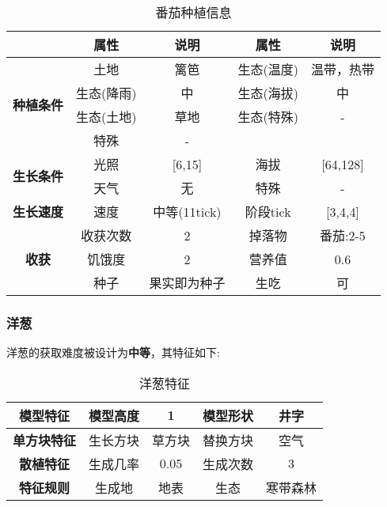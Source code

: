 \begin{table}[H]
    \centering
    \caption{番茄种植信息}
    \label{table:番茄种植信息}
    \setlength{\tabcolsep}{4mm}
    \begin{tabular}{c|cc|cc}
        \toprule
                                           & \textbf{属性} & \textbf{说明} & \textbf{属性} & \textbf{说明} \\
        \midrule
        \multirow{4}{*}{\textbf{种植条件}} & 土地          & 篱笆          & 生态(温度)    & 温带，热带    \\
                                           & 生态(降雨)    & 中            & 生态(海拔)    & 中            \\
                                           & 生态(土地)    & 草地          & 生态(特殊)    & -             \\
                                           & 特殊          & -                                             \\
        \midrule
        \multirow{2}{*}{\textbf{生长条件}} & 光照          & [6,15]        & 海拔          & [64,128]      \\
                                           & 天气          & 无            & 特殊          & -             \\
        \midrule
        \textbf{生长速度}                  & 速度          & 中等(11tick)  & 阶段tick      & [3,4,4]       \\
        \midrule
        \multirow{3}{*}{\textbf{收获}}     & 收获次数      & 2             & 掉落物        & 番茄:2-5      \\
                                           & 饥饿度        & 2             & 营养值        & 0.6           \\
                                           & 种子          & 果实即为种子  & 生吃          & 可            \\
        \bottomrule
    \end{tabular}
\end{table}

\subsubsection{洋葱}

洋葱的获取难度被设计为\textbf{中等}，其特征如下:
\begin{table}[H]
    \centering
    \caption{洋葱特征}
    \label{table:洋葱特征}
    \setlength{\tabcolsep}{4mm}
    \begin{tabular}{c|cc|cc}
        \toprule
        \textbf{模型特征}   & 模型高度 & 1      & 模型形状 & 井字     \\
        \midrule
        \textbf{单方块特征} & 生长方块 & 草方块 & 替换方块 & 空气     \\
        \midrule
        \textbf{散植特征}   & 生成几率 & 0.05   & 生成次数 & 3        \\
        \midrule
        \textbf{特征规则}   & 生成地   & 地表   & 生态     & 寒带森林 \\
        \bottomrule
    \end{tabular}
\end{table}


